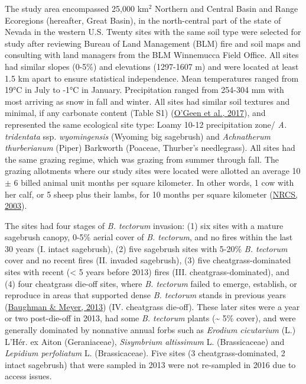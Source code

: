 \documentclass[
  11pt,
  a4paper,
]{article}
\begin{document}
The study area encompassed 25,000 km\(^2\) Northern and Central Basin and Range Ecoregions (hereafter, Great Basin), in the north-central part of the state of Nevada in the western U.S. Twenty sites with the same soil type were selected for study after reviewing Bureau of Land Management (BLM) fire and soil maps and consulting with land managers from the BLM Winnemucca Field Office. All sites had similar slopes (0-5\%) and elevations (1297-1607 m) and were located at least 1.5 km apart to ensure statistical independence. Mean temperatures ranged from 19°C in July to -1°C in January. Precipitation ranged from 254-304 mm with most arriving as snow in fall and winter. All sites had similar soil textures and minimal, if any carbonate content (Table S1) (\protect\hyperlink{ref-OGeen2017}{O'Geen et al., 2017}), and represented the same ecological site type: Loamy 10-12 precipitation zone/ \emph{A. tridentata} ssp. \emph{wyomingensis} (Wyoming big sagebrush) and \emph{Achnatherum thurberianum} (Piper) Barkworth (Poaceae, Thurber's needlegrass). All sites had the same grazing regime, which was grazing from summer through fall. The grazing allotments where our study sites were located were allotted an average 10 \(\pm\) 6 billed animal unit months per square kilometer. In other words, 1 cow with her calf, or 5 sheep plus their lambs, for 10 months per square kilometer (\protect\hyperlink{ref-NRCS2003}{NRCS, 2003}).

The sites had four stages of \emph{B. tectorum} invasion: (1) six sites with a mature sagebrush canopy, 0-5\% aerial cover of \emph{B. tectorum}, and no fires within the last 30 years (I. intact sagebrush), (2) five sagebrush sites with 5-20\% \emph{B. tectorum} cover and no recent fires (II. invaded sagebrush), (3) five cheatgrass-dominated sites with recent (\textless{} 5 years before 2013) fires (III. cheatgrass-dominated), and (4) four cheatgrass die-off sites, where \emph{B. tectorum} failed to emerge, establish, or reproduce in areas that supported dense \emph{B. tectorum} stands in previous years (\protect\hyperlink{ref-Baughman2013}{Baughman \& Meyer, 2013}) (IV. cheatgrass die-off). These later sites were a year or two post-die-off in 2013, had some \emph{B. tectorum} plants (\textasciitilde{} 5\% cover), and were generally dominated by nonnative annual forbs such as \emph{Erodium cicutarium} (L.) L'Hér. ex Aiton (Geraniaceae), \emph{Sisymbrium altissimum} L. (Brassicaceae) and \emph{Lepidium perfoliatum} L. (Brassicaceae). Five sites (3 cheatgrass-dominated, 2 intact sagebrush) that were sampled in 2013 were not re-sampled in 2016 due to access issues.
\end{document}
